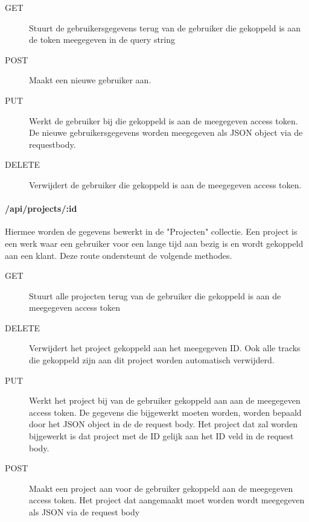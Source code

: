 \documentclass[a4paper,11pt]{article}
\begin{document}
\begin{description}
\item[GET] Stuurt de gebruikersgegevens terug van de gebruiker die gekoppeld is aan de token meegegeven in de query string
\item[POST] Maakt een nieuwe gebruiker aan.
\item[PUT] Werkt de gebruiker bij die gekoppeld is aan de meegegeven access token. De nieuwe gebruikersgegevens worden meegegeven als JSON object via de requestbody.
\item[DELETE] Verwijdert de gebruiker die gekoppeld is aan de meegegeven access token.
\end{description}

\paragraph{/api/projects/:id}
Hiermee worden de gegevens bewerkt in de "Projecten" collectie. Een project is een werk waar een gebruiker voor een lange tijd aan bezig is en wordt gekoppeld aan een klant. Deze route ondersteunt de volgende methodes.

\begin{description}
\item[GET] Stuurt alle projecten terug van de gebruiker die gekoppeld is aan de meegegeven access token
\item[DELETE] Verwijdert het project gekoppeld aan het meegegeven ID. Ook alle tracks die gekoppeld zijn aan dit project worden automatisch verwijderd.
\item[PUT] Werkt het project bij van de gebruiker gekoppeld aan aan de meegegeven access token. De gegevens die bijgewerkt moeten worden, worden bepaald door het JSON object in de de request body. Het project dat zal worden bijgewerkt is dat project met de ID gelijk aan het ID veld in de request body.
\item[POST] Maakt een project aan voor de gebruiker gekoppeld aan de meegegeven access token. Het project dat aangemaakt moet worden wordt meegegeven als JSON via de request body
\end{description}
\end{document}
